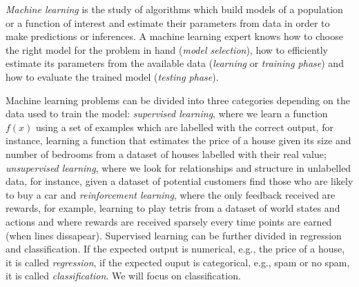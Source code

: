 \emph{Machine learning} is the study of algorithms which build models of a population or a function of interest and estimate their parameters from data in order to make predictions or inferences. A machine learning expert knows how to choose the right model for the problem in hand (\emph{model selection}), how to efficiently estimate its parameters from the available data (\emph{learning} or \emph{training phase}) and how to evaluate the trained model (\emph{testing phase}).

Machine learning problems can be divided into three categories depending on the data used to train the model: \emph{supervised learning}, where we learn a function $f(x)$ using a set of examples which are labelled with the correct output, for instance, learning a function that estimates the price of a house given its size and number of bedrooms from a dataset of houses labelled with their real value; \emph{unsupervised learning}, where we look for relationships and structure in unlabelled data, for instance, given a dataset of potential customers find those who are likely to buy a car and \emph{reinforcement learning}, where the only feedback received are rewards, for example, learning to play tetris from a dataset of world states and actions and where rewards are received sparsely every time points are earned (when lines dissapear). Supervised learning can be further divided in regression and classification. If the expected output is numerical, e.g., the price of a house, it is called \emph{regression}, if the expected ouput is categorical, e.g., spam or no spam, it is called \emph{classification}. We will focus on classification.

